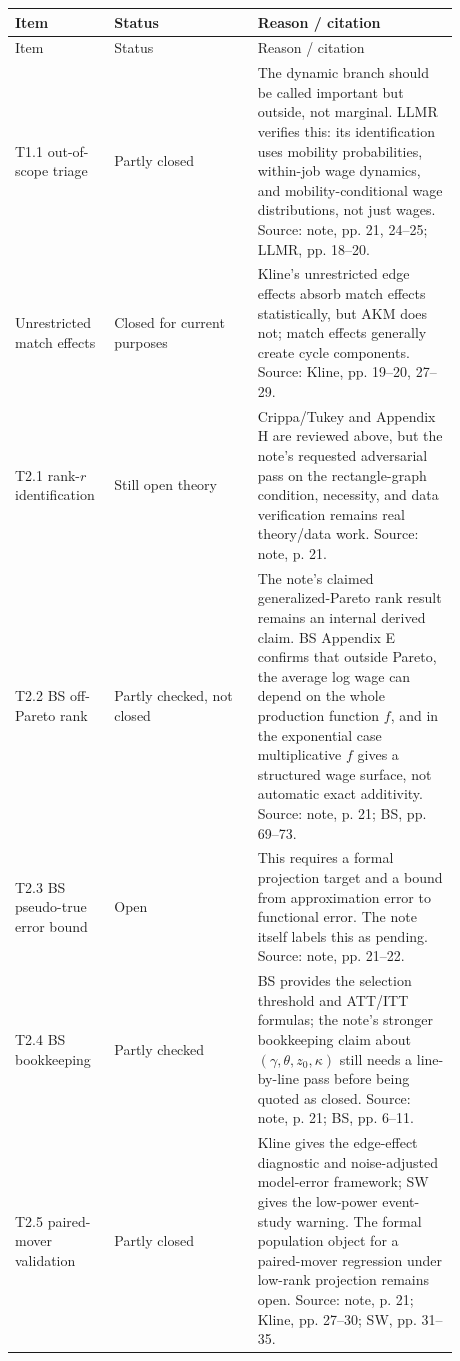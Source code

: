 \documentclass[11pt]{article}
\begin{document}
\begin{longtable}{>{\raggedright\arraybackslash}p{0.16\linewidth}
                  >{\raggedright\arraybackslash}p{0.30\linewidth}
                  >{\raggedright\arraybackslash}p{0.42\linewidth}}
\toprule
Item & Status & Reason / citation \\
\midrule
\endfirsthead
\toprule
Item & Status & Reason / citation \\
\midrule
\endhead
T1.1 out-of-scope triage & Partly closed & The dynamic branch should be called important but outside, not marginal. LLMR verifies this: its identification uses mobility probabilities, within-job wage dynamics, and mobility-conditional wage distributions, not just wages. Source: note, pp. 21, 24--25; LLMR, pp. 18--20. \\
Unrestricted match effects & Closed for current purposes & Kline's unrestricted edge effects absorb match effects statistically, but AKM does not; match effects generally create cycle components. Source: Kline, pp. 19--20, 27--29. \\
T2.1 rank-$r$ identification & Still open theory & Crippa/Tukey and Appendix H are reviewed above, but the note's requested adversarial pass on the rectangle-graph condition, necessity, and data verification remains real theory/data work. Source: note, p. 21. \\
T2.2 BS off-Pareto rank & Partly checked, not closed & The note's claimed generalized-Pareto rank result remains an internal derived claim. BS Appendix E confirms that outside Pareto, the average log wage can depend on the whole production function $f$, and in the exponential case multiplicative $f$ gives a structured wage surface, not automatic exact additivity. Source: note, p. 21; BS, pp. 69--73. \\
T2.3 BS pseudo-true error bound & Open & This requires a formal projection target and a bound from approximation error to functional error. The note itself labels this as pending. Source: note, pp. 21--22. \\
T2.4 BS bookkeeping & Partly checked & BS provides the selection threshold and ATT/ITT formulas; the note's stronger bookkeeping claim about $(\gamma,\theta,z_0,\kappa)$ still needs a line-by-line pass before being quoted as closed. Source: note, p. 21; BS, pp. 6--11. \\
T2.5 paired-mover validation & Partly closed & Kline gives the edge-effect diagnostic and noise-adjusted model-error framework; SW gives the low-power event-study warning. The formal population object for a paired-mover regression under low-rank projection remains open. Source: note, p. 21; Kline, pp. 27--30; SW, pp. 31--35. \\

\end{longtable}
\end{document}
